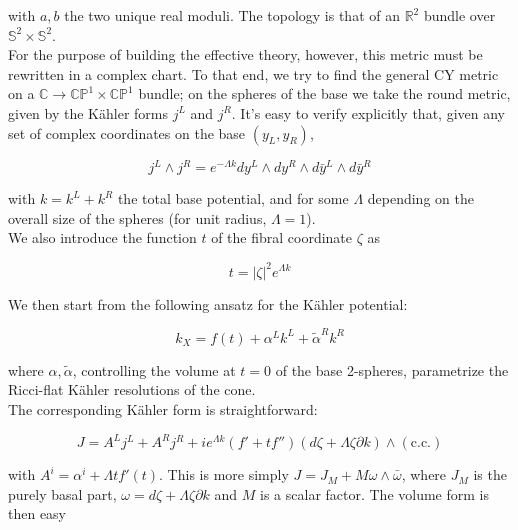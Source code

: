 \documentclass[11pt,a4paper,oneside,openright,titlepage]{book}
\begin{document}
with $a,b$ the two unique real moduli. The topology is that of an $\mathbb{R}^2$ bundle over $\mathbb{S}^2 \times \mathbb{S}^2$.\\

For the purpose of building the effective theory, however, this metric must be rewritten in a complex chart. To that end, we try to find the general CY metric on a $\mathbb{C} \rightarrow \mathbb{CP}^1 \times \mathbb{CP}^1$ bundle; on the spheres of the base we take the round metric, given by the K\"ahler forms $j^L$ and $j^R$. It's easy to verify explicitly that, given any set of complex coordinates on the base $(y_L,y_R)$,

\begin{equation}
	j^L \wedge j^R = e^{-\Lambda k} dy^L \wedge dy^R \wedge d\bar y^L \wedge d\bar y^R
\end{equation}

with $k = k^L + k^R$ the total base potential, and for some $\Lambda$ depending on the overall size of the spheres (for unit radius, $\Lambda = 1$).\\

We also introduce the function $t$ of the fibral coordinate $\zeta$ as 

\begin{equation}
	t = |\zeta|^2 e^{\Lambda k}
\end{equation}

We then start from the following ansatz for the K\"ahler potential:

\begin{equation}
	k_X = f(t) + \alpha^L k^L + \tilde\alpha^R k^R
\end{equation}

where $\alpha,\tilde\alpha$, controlling the volume at $t=0$ of the base 2-spheres, parametrize the Ricci-flat K\"ahler resolutions of the cone.\\

The corresponding K\"ahler form is straightforward:

\begin{equation}
	J = A^L j^L + A^R j^R + i e^{\Lambda k} (f' + t f'') (d\zeta + \Lambda \zeta \partial k) \wedge (\mathrm{c.c.})
\end{equation}

with $A^i = \alpha^i + \Lambda t f'(t)$. This is more simply $J = J_M + M \omega \wedge \bar \omega$, where $J_M$ is the purely basal part, $\omega = d\zeta + \Lambda \zeta \partial k$ and $M$ is a scalar factor. The volume form is then easy
\end{document}
